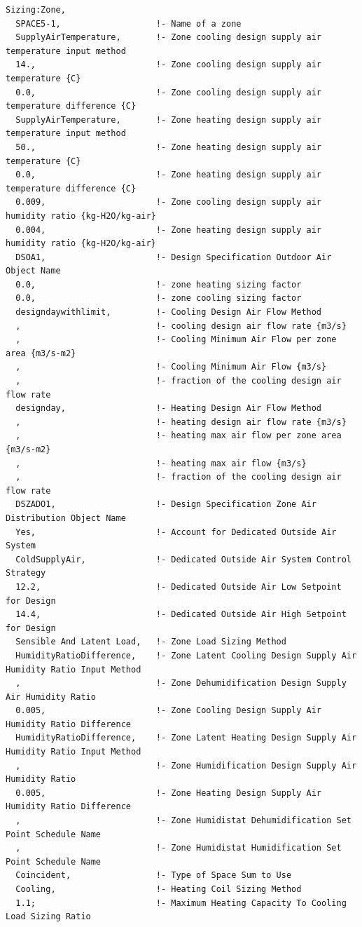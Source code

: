 \begin{lstlisting}
Sizing:Zone,
  SPACE5-1,                   !- Name of a zone
  SupplyAirTemperature,       !- Zone cooling design supply air temperature input method
  14.,                        !- Zone cooling design supply air temperature {C}
  0.0,                        !- Zone cooling design supply air temperature difference {C}
  SupplyAirTemperature,       !- Zone heating design supply air temperature input method
  50.,                        !- Zone heating design supply air temperature {C}
  0.0,                        !- Zone heating design supply air temperature difference {C}
  0.009,                      !- Zone cooling design supply air humidity ratio {kg-H2O/kg-air}
  0.004,                      !- Zone heating design supply air humidity ratio {kg-H2O/kg-air}
  DSOA1,                      !- Design Specification Outdoor Air Object Name
  0.0,                        !- zone heating sizing factor
  0.0,                        !- zone cooling sizing factor
  designdaywithlimit,         !- Cooling Design Air Flow Method
  ,                           !- cooling design air flow rate {m3/s}
  ,                           !- Cooling Minimum Air Flow per zone area {m3/s-m2}
  ,                           !- Cooling Minimum Air Flow {m3/s}
  ,                           !- fraction of the cooling design air flow rate
  designday,                  !- Heating Design Air Flow Method
  ,                           !- heating design air flow rate {m3/s}
  ,                           !- heating max air flow per zone area {m3/s-m2}
  ,                           !- heating max air flow {m3/s}
  ,                           !- fraction of the cooling design air flow rate
  DSZADO1,                    !- Design Specification Zone Air Distribution Object Name
  Yes,                        !- Account for Dedicated Outside Air System
  ColdSupplyAir,              !- Dedicated Outside Air System Control Strategy
  12.2,                       !- Dedicated Outside Air Low Setpoint for Design
  14.4,                       !- Dedicated Outside Air High Setpoint for Design
  Sensible And Latent Load,   !- Zone Load Sizing Method
  HumidityRatioDifference,    !- Zone Latent Cooling Design Supply Air Humidity Ratio Input Method
  ,                           !- Zone Dehumidification Design Supply Air Humidity Ratio
  0.005,                      !- Zone Cooling Design Supply Air Humidity Ratio Difference
  HumidityRatioDifference,    !- Zone Latent Heating Design Supply Air Humidity Ratio Input Method
  ,                           !- Zone Humidification Design Supply Air Humidity Ratio
  0.005,                      !- Zone Heating Design Supply Air Humidity Ratio Difference
  ,                           !- Zone Humidistat Dehumidification Set Point Schedule Name
  ,                           !- Zone Humidistat Humidification Set Point Schedule Name
  Coincident,                 !- Type of Space Sum to Use
  Cooling,                    !- Heating Coil Sizing Method
  1.1;                        !- Maximum Heating Capacity To Cooling Load Sizing Ratio


\end{lstlisting}
